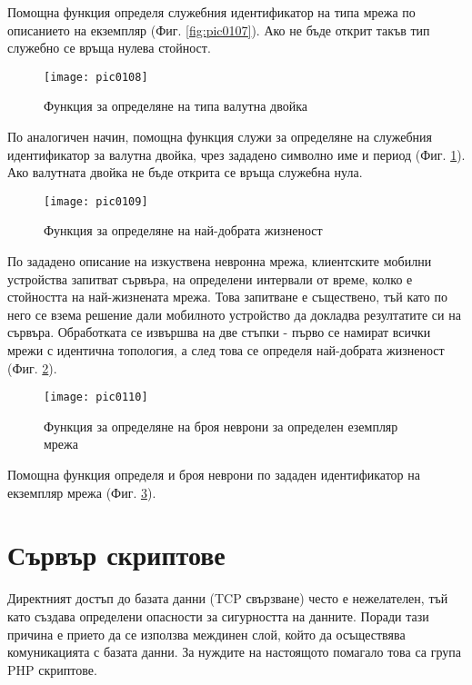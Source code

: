 Помощна функция определя служебния идентификатор на типа мрежа по описанието на екземпляр (Фиг. \ref{fig:pic0107}). Ако не бъде открит такъв тип служебно се връща нулева стойност. 

\begin{figure}[h]
  \centering
  \texttt{[image: pic0108]}
  \caption{Функция за определяне на типа валутна двойка}
\label{fig:pic0108}
\end{figure}
\FloatBarrier

По аналогичен начин, помощна функция служи за определяне на служебния идентификатор за валутна двойка, чрез зададено символно име и период (Фиг. \ref{fig:pic0108}). Ако валутната двойка не бъде открита се връща служебна нула. 

\begin{figure}[h]
  \centering
  \texttt{[image: pic0109]}
  \caption{Функция за определяне на най-добрата жизненост}
\label{fig:pic0109}
\end{figure}
\FloatBarrier

По зададено описание на изкуствена невронна мрежа, клиентските мобилни устройства запитват сървъра, на определени интервали от време, колко е стойността на най-жизнената мрежа. Това запитване е съществено, тъй като по него се взема решение дали мобилното устройство да докладва резултатите си на сървъра. Обработката се извършва на две стъпки - първо се намират всички мрежи с идентична топология, а след това се определя най-добрата жизненост (Фиг. \ref{fig:pic0109}).

\begin{figure}[h]
  \centering
  \texttt{[image: pic0110]}
  \caption{Функция за определяне на броя неврони за определен еземпляр мрежа}
\label{fig:pic0110}
\end{figure}
\FloatBarrier

Помощна функция определя и броя неврони по зададен идентификатор на екземпляр мрежа (Фиг. \ref{fig:pic0110}).

\section{Сървър скриптове}

Директният достъп до базата данни (TCP свързване) често е нежелателен, тъй като създава определени опасности за сигурността на данните. Поради тази причина е прието да се използва междинен слой, който да осъществява комуникацията с базата данни. За нуждите на настоящото помагало това са група PHP скриптове. 

